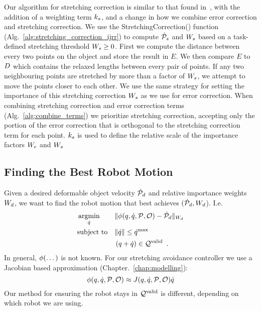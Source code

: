 Our algorithm for stretching correction is similar to that found in~\cite{Berenson2013}, with the addition of a weighting term $k_s$, and a change in how we combine error correction and stretching correction. We use the StretchingCorrection() function (Alg.~\ref{alg:stretching_correction_ijrr}) to compute $\dot{\mathcal{P}}_s$ and $W_s$ based on a task-defined stretching threshold $W_s \geq 0$. First we compute the distance between every two points on the object and store the result in $E$. We then compare $E$ to $D$ which contains the relaxed lengths between every pair of points. If any two neighbouring points are stretched by more than a factor of $W_s$, we attempt to move the points closer to each other. We use the same strategy for setting the importance of this stretching correction $W_s$ as we use for error correction. When combining stretching correction and error correction terms (Alg.~\ref{alg:combine_terms}) we prioritize stretching correction, accepting only the portion of the error correction that is orthogonal to the stretching correction term for each point. $k_s$ is used to define the relative scale of the importance factors $W_e$ and $W_s$


\subsection{Finding the Best Robot Motion}


Given a desired deformable object velocity $\dot{\mathcal{P}}_d$ and relative importance weights $W_d$, we want to find the robot motion that best achieves $(\dot{\mathcal{P}}_d, W_d$). I.e.
\begin{equation}
\begin{aligned}
    & \operatorname*{argmin}_{\dot{q}} 
        & & \| \phi(q, \dot{q}, \mathcal{P}, \mathcal{O}) - \dot{\mathcal{P}}_d \|_{W_d} \\
    & \text{subject to}
        & & \| \dot{q} \| \leq \dot{q}^\textrm{max} \\
    &   & & \left(q + \dot{q} \right) \in \mathcal{Q}^{\textrm{valid}} \enspace .
\end{aligned}
\label{eqn:controller_minimization_problem_apx}
\end{equation}
In general, $\phi(\dots)$ is not known. For our stretching avoidance controller we use a Jacobian based approximation (Chapter.~\ref{chap:modelling}):
\begin{equation}
    \phi(q, \dot{q}, \mathcal{P}, \mathcal{O}) \approx J(q, \dot{q}, \mathcal{P}, \mathcal{O}) \dot{q}
\end{equation}
Our method for ensuring the robot stays in $\mathcal{Q}^{\textrm{valid}}$ is different, depending on which robot we are using.

